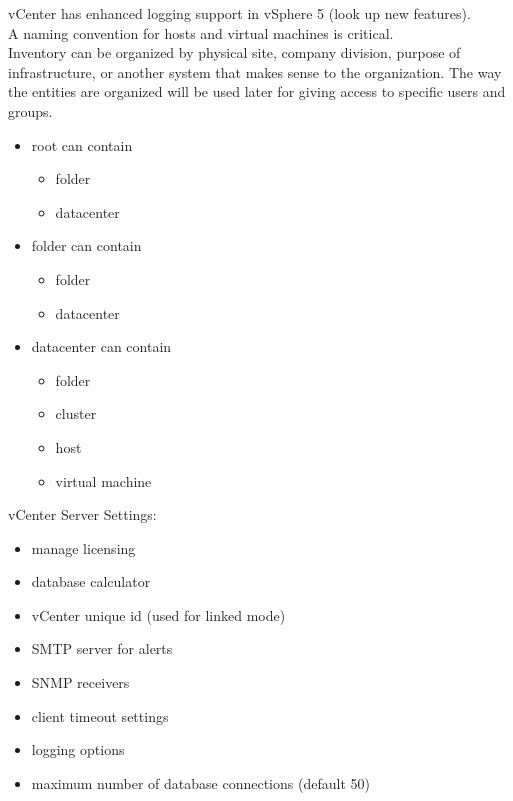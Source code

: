 vCenter has enhanced logging support in vSphere 5 (look up new features).\\

A naming convention for hosts and virtual machines is critical.\\

Inventory can be organized by physical site, company division, purpose of
infrastructure, or another system that makes sense to the organization. The
way the entities are organized will be used later for giving access to specific
users and groups.

\begin{itemize}

\item root can contain

  \begin{itemize}
  \item folder
  \item datacenter
  \end{itemize}

\item folder can contain

  \begin{itemize}
  \item folder
  \item datacenter
  \end{itemize}

\item datacenter can contain

  \begin{itemize}
  \item folder
  \item cluster
  \item host 
  \item virtual machine
  \end{itemize}

\end{itemize}

vCenter Server Settings:

\begin{itemize}
\item manage licensing
\item database calculator
\item vCenter unique id (used for linked mode)
\item SMTP server for alerts
\item SNMP receivers
\item client timeout settings
\item logging options
\item maximum number of database connections (default 50)
\end{itemize}

